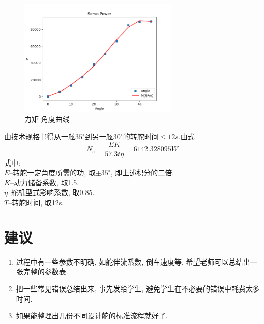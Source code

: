 \documentclass[a4paper,UTF8]{article}
\begin{document}
\begin{figure}
	\centering
	\includegraphics[width=3in]{figure/rudder_power}
	\caption{力矩-角度曲线}
	\label{fig:power}
\end{figure}
由技术规格书得从一舷$35^{\circ}$到另一舷$30^{\circ}$的转舵时间$\leq12s$.由式
\begin{equation}
	N_e=\frac{EK}{57.3t\eta}=6142.328095W
\end{equation}
式中:\\
$E$--转舵一定角度所需的功, 取$\pm35^{\circ}$, 即上述积分的二倍.\\
$K$--动力储备系数, 取1.5.\\
$\eta$--舵机型式影响系数, 取0.85.\\
$T$--转舵时间, 取12s.

\section{建议}
\begin{enumerate}
	\item 过程中有一些参数不明确, 如舵伴流系数, 倒车速度等, 希望老师可以总结出一张完整的参数表.
	\item 把一些常见错误总结出来, 事先发给学生, 避免学生在不必要的错误中耗费太多时间.
	\item 如果能整理出几份不同设计舵的标准流程就好了.
\end{enumerate}

\label{last}
\end{document}
